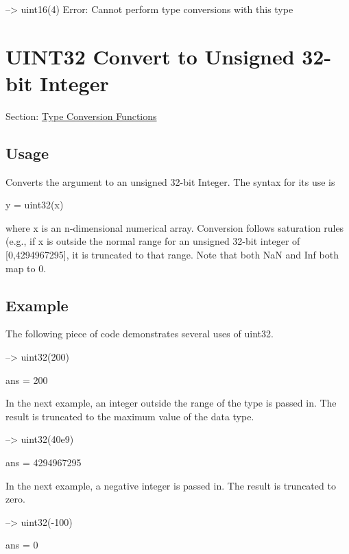 \begin{DoxyVerbInclude}
--> uint16({4})
Error: Cannot perform type conversions with this type
\end{DoxyVerbInclude}
 \hypertarget{typecast_uint32}{}\section{U\-I\-N\-T32 Convert to Unsigned 32-\/bit Integer}\label{typecast_uint32}
Section\-: \hyperlink{sec_typecast}{Type Conversion Functions} \hypertarget{vtkwidgets_vtkxyplotwidget_Usage}{}\subsection{Usage}\label{vtkwidgets_vtkxyplotwidget_Usage}
Converts the argument to an unsigned 32-\/bit Integer. The syntax for its use is \begin{DoxyVerb}   y = uint32(x)
\end{DoxyVerb}
 where {\ttfamily x} is an {\ttfamily n}-\/dimensional numerical array. Conversion follows saturation rules (e.\-g., if {\ttfamily x} is outside the normal range for an unsigned 32-\/bit integer of {\ttfamily \mbox{[}0,4294967295\mbox{]}}, it is truncated to that range. Note that both {\ttfamily Na\-N} and {\ttfamily Inf} both map to 0. \hypertarget{variables_struct_Example}{}\subsection{Example}\label{variables_struct_Example}
The following piece of code demonstrates several uses of {\ttfamily uint32}.


\begin{DoxyVerbInclude}
--> uint32(200)

ans = 
 200 
\end{DoxyVerbInclude}


In the next example, an integer outside the range of the type is passed in. The result is truncated to the maximum value of the data type.


\begin{DoxyVerbInclude}
--> uint32(40e9)

ans = 
 4294967295 
\end{DoxyVerbInclude}


In the next example, a negative integer is passed in. The result is truncated to zero.


\begin{DoxyVerbInclude}
--> uint32(-100)

ans = 
 0 
\end{DoxyVerbInclude}


